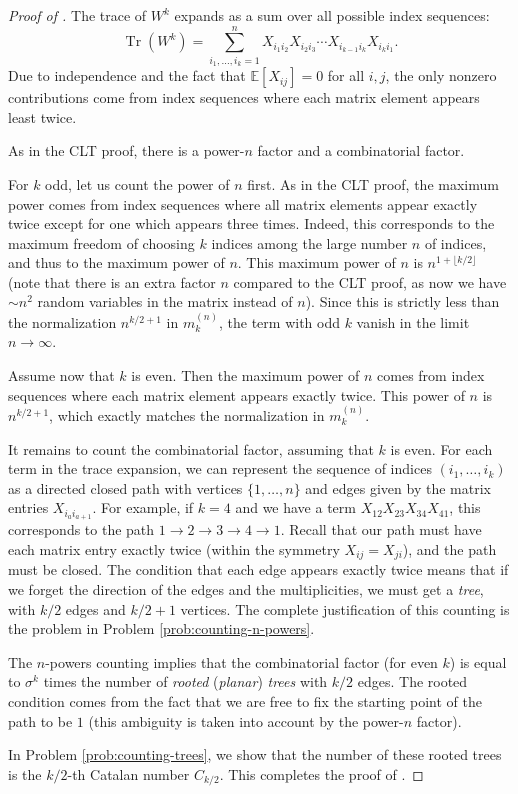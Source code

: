 \documentclass[letterpaper,11pt,oneside,reqno]{article}
\numberwithin{equation}{section}
\theoremstyle{definition}
\begin{document}
\begin{proof}[Proof of ]
	The trace of $W^k$ expands as a sum over all possible index sequences:
	\begin{equation}
		\operatorname{Tr}(W^k) = \sum_{i_1,\ldots,i_k=1}^n X_{i_1i_2}X_{i_2i_3}\cdots X_{i_{k-1}i_k}X_{i_ki_1}.
	\end{equation}
	Due to independence and the fact that
	$\mathbb{E}[X_{ij}]=0$ for all $i,j$, the only nonzero
	contributions come from index sequences
	where each matrix element appears least twice.

	As in the CLT proof, there is a power-$n$ factor and a combinatorial factor.

	For $k$ odd, let us count the power of $n$ first. As
	in the CLT proof, the
	maximum power comes from index sequences where all matrix
	elements appear exactly twice except for one which appears
	three times. Indeed, this corresponds to the maximum
	freedom of choosing $k$ indices among the large number $n$
	of indices, and thus to the maximum power of $n$.
	This maximum power of $n$ is $n^{1+\lfloor k/2 \rfloor }$
	(note that there is an extra factor $n$ compared to the CLT proof,
	as now we have $\sim n^2$ random variables in the matrix instead of $n$).
	Since this is strictly less than the
	normalization $n^{k/2+1}$ in $m_k^{(n)}$, the term with odd $k$
	vanish in the limit $n\to\infty$.

	Assume now that $k$ is even.
	Then the maximum power of $n$ comes from index sequences where each matrix element appears exactly twice.
	This power of $n$ is $n^{k/2+1}$, which exactly
	matches the normalization in $m_k^{(n)}$.

	It remains to count the combinatorial factor,
	assuming that $k$ is even.
	For each term in the trace expansion, we can represent the sequence of indices $(i_1,\ldots,i_k)$ as a directed closed path with vertices $\{1,\ldots,n\}$ and edges given by the matrix entries $X_{i_ai_{a+1}}$. For example, if $k=4$ and we have a term $X_{12}X_{23}X_{34}X_{41}$, this corresponds to the path $1\to 2\to 3\to 4\to 1$. Recall that our path must have each
	matrix entry exactly twice (within the symmetry $X_{ij}=X_{ji}$),
	and the path must be closed.
	The condition that each edge appears exactly twice
	means that if we forget the direction of the edges and the multiplicities,
	we must get a \emph{tree}, with $k/2$ edges and $k/2+1$ vertices.
	The complete justification of this counting is the
	problem in Problem \ref{prob:counting-n-powers}.

	The $n$-powers counting implies that the combinatorial
	factor (for even $k$)
	is equal to $\sigma^k$ times the
	number of \emph{rooted} (\emph{planar}) \emph{trees} with $k/2$ edges.
	The rooted condition comes from the fact that
	we are free to fix the starting point of the path
	to be $1$ (this ambiguity is taken into account by the
	power-$n$ factor).

	In Problem \ref{prob:counting-trees}, we show that the number of these rooted trees is the $k/2$-th Catalan number $C_{k/2}$.
	This completes the proof of .
\end{proof}
\end{document}
